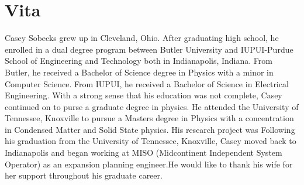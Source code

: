 \chapter*{Vita} \label{ch:vita}
Casey Sobecks grew up in Cleveland, Ohio. After graduating high school, he enrolled in a dual degree program between Butler University and IUPUI-Purdue School of Engineering and Technology both in Indianapolis, Indiana. From Butler, he received a Bachelor of Science degree in Physics with a minor in Computer Science. From IUPUI, he received a Bachelor of Science in Electrical Engineering. With a strong sense that his education was not complete, Casey continued on to purse a graduate degree in physics. He attended the University of Tennessee, Knoxville to pursue a Masters degree in Physics with a concentration in Condensed Matter and Solid State physics. His research project was 
Following his graduation from the University of Tennessee, Knoxville, Casey moved back to Indianapolis and began working at MISO (Midcontinent Independent System Operator) as an expansion planning engineer.He would like to thank his wife for her support throughout his graduate career. 